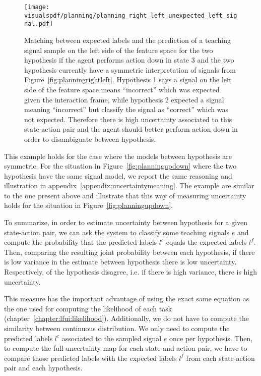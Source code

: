 \begin{figure}[!ht]
  \centering
  \texttt{[image: \\visualspdf/planning/planning\_right\_left\_unexpected\_left\_signal.pdf]}
  \caption{Matching between expected labels and the prediction of a teaching signal sample on the left side of the feature space for the two hypothesis if the agent performs action down in state 3 and the two hypothesis currently have a symmetric interpretation of signals from Figure~\ref{fig:planningrightleft}. Hypothesis 1 says a signal on the left side of the feature space means ``incorrect'' which was expected given the interaction frame, while hypothesis 2 expected a signal meaning ``incorrect'' but classify the signal as ``correct'' which was not expected. Therefore there is high uncertainty associated to this state-action pair and the agent should better perform action down in order to disambiguate between hypothesis.}
  \label{fig:uncertaintymeaningrightleftunexpectedleft}
\end{figure}

This example holds for the case where the models between hypothesis are symmetric. For the situation in Figure~\ref{fig:planningupdown} where the two hypothesis have the same signal model, we report the same reasoning and illustration in appendix~\ref{appendix:uncertaintymeaning}. The example are similar to the one present above and illustrate that this way of measuring uncertainty holds for the situation in Figure~\ref{fig:planningupdown}.

To summarize, in order to estimate uncertainty between hypothesis for a given state-action pair, we can ask the system to classify some teaching signals $e$ and compute the probability that the predicted labels $l^c$ equals the expected labels $l^f$. Then, comparing the resulting joint probability between each hypothesis, if there is low variance in the estimate between hypothesis there is low uncertainty. Respectively, of the hypothesis disagree, i.e. if there is high variance, there is high uncertainty. 

This measure has the important advantage of using the exact same equation as the one used for computing the likelihood of each task (chapter~\ref{chapter:lfui:likelihood}). Additionally, we do not have to compute the similarity between continuous distribution. We only need to compute the predicted labels $l^c$ associated to the sampled signal $e$ once per hypothesis. Then, to compute the full uncertainty map for each state and action pair, we have to compare those predicted labels with the expected labels $l^f$ from each state-action pair and each hypothesis.

